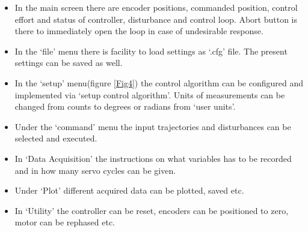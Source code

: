 \documentclass[11pt, a4paper]{article}
\begin{document}
\begin{itemize}
\item In the main screen there are encoder positions, commanded position, control effort and status of controller, disturbance and control loop. Abort button is there to immediately open the loop in case of undesirable response.
\item In the ‘file’ menu there is facility to load settings as ‘.cfg’ file. The present settings can be saved as well.
\item In the ‘setup’ menu(figure \ref{Fig4}) the control algorithm can be configured and implemented via ‘setup control algorithm’. Units of measurements can be changed from counts to degrees or radians from ‘user units’.
\item Under the ‘command’ menu the input trajectories and disturbances can be selected and executed.
\item In ‘Data Acquisition’ the instructions on what variables has to be recorded and in how many servo cycles can be given.
\item Under ‘Plot’ different acquired data can be plotted, saved etc.
\item In ‘Utility’ the controller can be reset, encoders can be positioned to zero, motor can be rephased etc.
\end{itemize}
\end{document}
